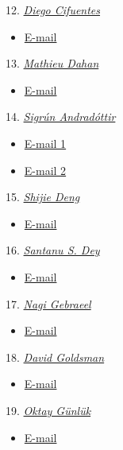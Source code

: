 12. \href{https://diegcif.github.io/}{\emph{Diego Cifuentes}}
\begin{itemize}
    \item \href{mailto:diego.cifuentes@isye.gatech.edu}{E-mail}
\end{itemize}

13. \href{https://sites.gatech.edu/mathieu-dahan/}{\emph{Mathieu Dahan}}
\begin{itemize}
    \item \href{mailto:mathieu.dahan@isye.gatech.edu}{E-mail}
\end{itemize}

14. \href{https://sites.gatech.edu/sigrun-andradottir/}{\emph{Sigrún Andradóttir}}
\begin{itemize}
    \item \href{mailto:sigrun.andradottir@isye.gatech.edu}{E-mail 1}
    \item \href{mailto:sa@gatech.edu}{E-mail 2}
\end{itemize}

15. \href{https://www2.isye.gatech.edu/faculty/Shijie_Deng/}{\emph{Shijie Deng}}
\begin{itemize}
    \item \href{mailto:deng@gatech.edu}{E-mail}
\end{itemize}

16. \href{https://www2.isye.gatech.edu/~sdey30/}{\emph{Santanu S. Dey}}
\begin{itemize}
    \item \href{santanu.dey@isye.gatech.edu}{E-mail}
\end{itemize}

17. \href{https://research.gatech.edu/people/nagi-gebraeel}{\emph{Nagi Gebraeel}}
\begin{itemize}
    \item \href{mailto:nagi.gebraeel@isye.gatech.edu}{E-mail}
\end{itemize}

18. \href{https://www2.isye.gatech.edu/people/faculty/David_Goldsman/}{\emph{David Goldsman}}
\begin{itemize}
    \item \href{mailto:sman@isye.gatech.edu}{E-mail}
\end{itemize}

19. \href{https://www.isye.gatech.edu/users/oktay-gunluk}{\emph{Oktay Günlük}}
\begin{itemize}
    \item \href{oktay.gunluk@isye.gatech.edu}{E-mail}
\end{itemize}

